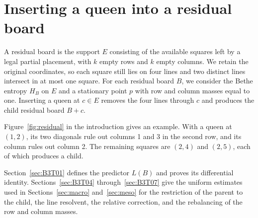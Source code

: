 \section{Inserting a queen into a residual board}\label{sec:insercion}

A residual board is the support $E$ consisting of the available squares left by a legal partial placement,
with $k$ empty rows and $k$ empty columns. We retain the original coordinates, so each square still lies on
four lines and two distinct lines intersect in at most one square. For each residual board $B$, we consider
the Bethe entropy $H_B$ on $E$ and a stationary point $p$ with row and column masses equal to one. Inserting
a queen at $c\in E$ removes the four lines through $c$ and produces the child residual board $B+c$.

Figure~\ref{fig:residual} in the introduction gives an example. With a queen at $(1,2)$, its two diagonals
rule out columns 1 and 3 in the second row, and its column rules out column 2. The remaining squares are
$(2,4)$ and $(2,5)$, each of which produces a child.

Section~\ref{sec:B3T01} defines the predictor $L(B)$ and proves its differential identity.
Sections~\ref{sec:B3T04} through~\ref{sec:B3T07} give the uniform estimates used in Sections~\ref{sec:macro}
and~\ref{sec:meso} for the restriction of the parent to the child, the line resolvent, the relative
correction, and the rebalancing of the row and column masses.
